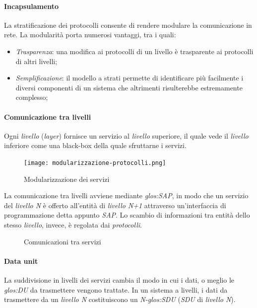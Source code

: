 \paragraph{Incapsulamento}
La stratificazione dei protocolli consente di rendere modulare la comunicazione in
rete. La modularità porta numerosi vantaggi, tra i quali:
\begin{itemize}
    \item \emph{Trasparenza}: una modifica ai protocolli di un livello è trasparente
    ai protocolli di altri livelli;
    \item \emph{Semplificazione}: il modello a strati permette di identificare più
    facilmente i diversi componenti di un sistema che altrimenti risulterebbe
    estremamente complesso;
\end{itemize}

\paragraph{Comunicazione tra livelli}
Ogni \emph{livello} (\emph{layer}) fornisce un servizio al \emph{livello}
superiore, il quale vede il \emph{livello} inferiore come una black-box della
quale sfruttarne i servizi.

\begin{figure}[h]
    \centering
    \texttt{[image: modularizzazione-protocolli.png]}
    \caption{Modularizzazione dei servizi}
\end{figure}\noindent
La comunicazione tra livelli avviene mediante \emph{\gls{glos:SAP}}, in
modo che un servizio del \emph{livello N} è offerto all'entità di
\emph{livello N+1} attraverso un'interfaccia di programmazione detta
appunto \emph{SAP}. Lo scambio di informazioni tra entità dello stesso
\emph{livello}, invece, è regolata dai \emph{protocolli}.

\begin{figure}[h]
    \centering
    \hfill
    \caption{Comunicazioni tra servizi}
\end{figure}

\paragraph{Data unit}
La suddivisione in livelli dei servizi cambia il modo in cui i dati, o meglio le
\emph{\gls{glos:DU}} da trasmettere vengono trattate. In un sistema a livelli, i dati da trasmettere da un \emph{livello
N} costituiscono un \emph{N-\gls{glos:SDU}} (\emph{SDU} di \emph{livello N}).

